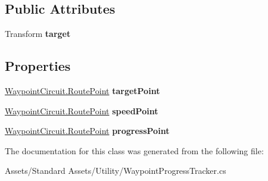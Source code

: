 \subsection*{Public Attributes}
\begin{DoxyCompactItemize}
\item 
Transform {\bfseries target}\hypertarget{class_unity_standard_assets_1_1_utility_1_1_waypoint_progress_tracker_aba34da851e821dd889429b06aaca0c3a}{}\label{class_unity_standard_assets_1_1_utility_1_1_waypoint_progress_tracker_aba34da851e821dd889429b06aaca0c3a}

\end{DoxyCompactItemize}
\subsection*{Properties}
\begin{DoxyCompactItemize}
\item 
\hyperlink{struct_unity_standard_assets_1_1_utility_1_1_waypoint_circuit_1_1_route_point}{Waypoint\+Circuit.\+Route\+Point} {\bfseries target\+Point}\hypertarget{class_unity_standard_assets_1_1_utility_1_1_waypoint_progress_tracker_ae0311c3935f8f193235e9e5120a57c47}{}\label{class_unity_standard_assets_1_1_utility_1_1_waypoint_progress_tracker_ae0311c3935f8f193235e9e5120a57c47}

\item 
\hyperlink{struct_unity_standard_assets_1_1_utility_1_1_waypoint_circuit_1_1_route_point}{Waypoint\+Circuit.\+Route\+Point} {\bfseries speed\+Point}\hypertarget{class_unity_standard_assets_1_1_utility_1_1_waypoint_progress_tracker_a12ee022c9a87d5d34ecc7c7fba75ef73}{}\label{class_unity_standard_assets_1_1_utility_1_1_waypoint_progress_tracker_a12ee022c9a87d5d34ecc7c7fba75ef73}

\item 
\hyperlink{struct_unity_standard_assets_1_1_utility_1_1_waypoint_circuit_1_1_route_point}{Waypoint\+Circuit.\+Route\+Point} {\bfseries progress\+Point}\hypertarget{class_unity_standard_assets_1_1_utility_1_1_waypoint_progress_tracker_a30133b0c8ffb941a78a549133c1e3767}{}\label{class_unity_standard_assets_1_1_utility_1_1_waypoint_progress_tracker_a30133b0c8ffb941a78a549133c1e3767}

\end{DoxyCompactItemize}


The documentation for this class was generated from the following file\+:\begin{DoxyCompactItemize}
\item 
Assets/\+Standard Assets/\+Utility/Waypoint\+Progress\+Tracker.\+cs\end{DoxyCompactItemize}

